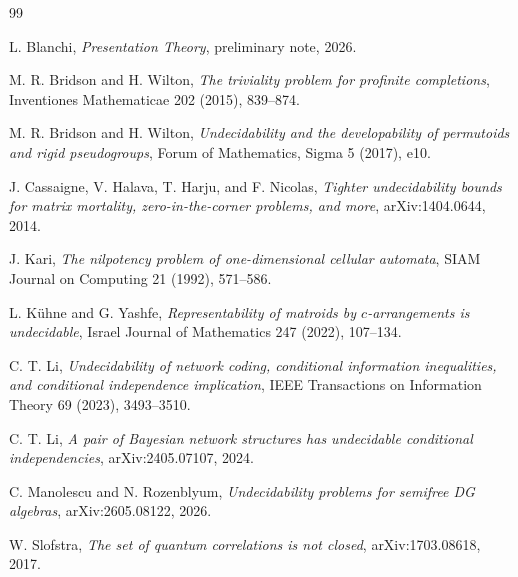 \documentclass[11pt]{article}
\begin{document}
\begin{thebibliography}{99}

L. Blanchi,
\emph{Presentation Theory},
preliminary note, 2026.

M. R. Bridson and H. Wilton,
\emph{The triviality problem for profinite completions},
Inventiones Mathematicae 202 (2015), 839--874.

M. R. Bridson and H. Wilton,
\emph{Undecidability and the developability of permutoids and rigid pseudogroups},
Forum of Mathematics, Sigma 5 (2017), e10.

J. Cassaigne, V. Halava, T. Harju, and F. Nicolas,
\emph{Tighter undecidability bounds for matrix mortality, zero-in-the-corner problems, and more},
arXiv:1404.0644, 2014.

J. Kari,
\emph{The nilpotency problem of one-dimensional cellular automata},
SIAM Journal on Computing 21 (1992), 571--586.

L. K\"uhne and G. Yashfe,
\emph{Representability of matroids by \(c\)-arrangements is undecidable},
Israel Journal of Mathematics 247 (2022), 107--134.

C. T. Li,
\emph{Undecidability of network coding, conditional information inequalities, and conditional independence implication},
IEEE Transactions on Information Theory 69 (2023), 3493--3510.

C. T. Li,
\emph{A pair of Bayesian network structures has undecidable conditional independencies},
arXiv:2405.07107, 2024.

C. Manolescu and N. Rozenblyum,
\emph{Undecidability problems for semifree DG algebras},
arXiv:2605.08122, 2026.

W. Slofstra,
\emph{The set of quantum correlations is not closed},
arXiv:1703.08618, 2017.

\end{thebibliography}
\end{document}
